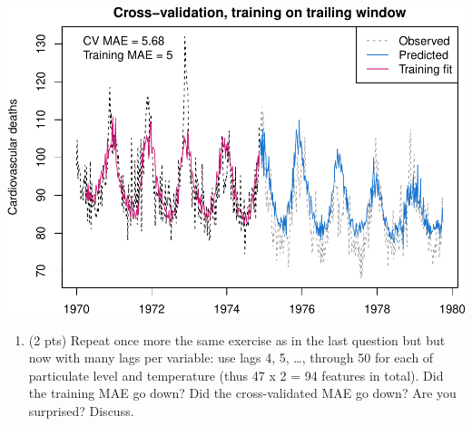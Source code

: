 \documentclass[
]{article}
\providecommand{\tightlist}{%
  \setlength{\itemsep}{0pt}\setlength{\parskip}{0pt}}
\begin{document}
\includegraphics{homework2_files/figure-latex/unnamed-chunk-3-1.pdf}

\begin{enumerate}
\def\labelenumi{\arabic{enumi}.}
\setcounter{enumi}{13}
\tightlist
\item
  (2 pts) Repeat once more the same exercise as in the last question but
  but now with many lags per variable: use lags 4, 5, \ldots, through 50
  for each of particulate level and temperature (thus 47 x 2 = 94
  features in total). Did the training MAE go down? Did the
  cross-validated MAE go down? Are you surprised? Discuss.
\end{enumerate}
\end{document}
